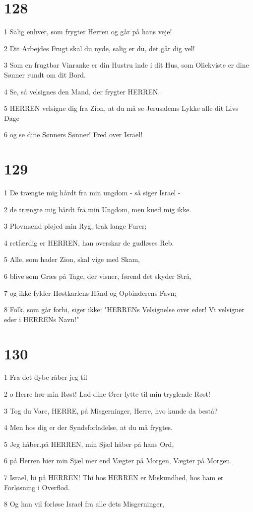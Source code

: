\chapter{128}

\par 1 Salig enhver, som frygter Herren og går på hans veje!
\par 2 Dit Arbejdes Frugt skal du nyde, salig er du, det går dig vel!
\par 3 Som en frugtbar Vinranke er din Hustru inde i dit Hus, som Oliekviste er dine Sønner rundt om dit Bord.
\par 4 Se, så velsignes den Mand, der frygter HERREN.
\par 5 HERREN velsigne dig fra Zion, at du må se Jerusalems Lykke alle dit Livs Dage
\par 6 og se dine Sønners Sønner! Fred over Israel!

\chapter{129}

\par 1 De trængte mig hårdt fra min ungdom - så siger Israel -
\par 2 de trængte mig hårdt fra min Ungdom, men kued mig ikke.
\par 3 Plovmænd pløjed min Ryg, trak lange Furer;
\par 4 retfærdig er HERREN, han overskar de gudløses Reb.
\par 5 Alle, som hader Zion, skal vige med Skam,
\par 6 blive som Græs på Tage, der visner, førend det skyder Strå,
\par 7 og ikke fylder Høstkarlens Hånd og Opbinderens Favn;
\par 8 Folk, som går forbi, siger ikke: "HERRENs Velsignelse over eder! Vi velsigner eder i HERRENs Navn!"

\chapter{130}

\par 1 Fra det dybe råber jeg til
\par 2 o Herre hør min Røst! Lad dine Ører lytte til min tryglende Røst!
\par 3 Tog du Vare, HERRE, på Misgerninger, Herre, hvo kunde da bestå?
\par 4 Men hos dig er der Syndsforladelse, at du må frygtes.
\par 5 Jeg håber.på HERREN, min Sjæl håber på hans Ord,
\par 6 på Herren bier min Sjæl mer end Vægter på Morgen, Vægter på Morgen.
\par 7 Israel, bi på HERREN! Thi hos HERREN er Miskundhed, hos ham er Forløsning i Overflod.
\par 8 Og han vil forløse Israel fra alle dets Misgerninger,

